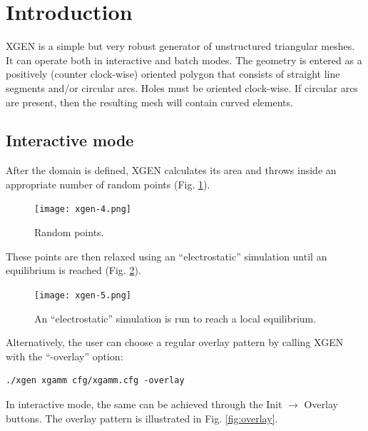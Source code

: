 \documentclass[12pt]{article}
\begin{document}
  \section{Introduction}

  XGEN is a simple but very robust generator of unstructured
  triangular meshes. It can operate both in interactive and batch modes.
  The geometry is entered as a positively (counter clock-wise) oriented 
  polygon that consists of straight line segments and/or circular arcs. Holes 
  must be oriented clock-wise. If circular arcs are present, then the resulting 
  mesh will contain curved elements.
  
  \subsection{Interactive mode}

  After the domain is defined, XGEN calculates its area and throws inside an 
  appropriate number of random points (Fig. \ref{fig:random}).

\newpage

  \begin{figure}[!ht]
  \begin{center}
  \texttt{[image: xgen-4.png]}
  \end{center}
  \vspace{-6mm}
  \caption{Random points.}
  \label{fig:random}
  \end{figure}
\noindent
These points are then relaxed using an ``electrostatic'' simulation
until an equilibrium is reached  (Fig. \ref{fig:equil}).

  \begin{figure}[!ht]
  \begin{center}
  \texttt{[image: xgen-5.png]}
  \end{center}
  \vspace{-6mm}
  \caption{An ``electrostatic'' simulation is run to reach a local equilibrium.}
  \label{fig:equil}
  \end{figure}

\noindent
Alternatively, the user can choose a regular overlay pattern by calling XGEN with 
the ``-overlay'' option:

\begin{verbatim}
./xgen xgamm cfg/xgamm.cfg -overlay
\end{verbatim}
In interactive mode, the same can be achieved through the Init $\rightarrow$ Overlay
buttons. The overlay pattern is illustrated in Fig. \ref{fig:overlay}. 
\end{document}
